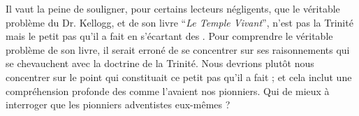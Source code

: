 Il vaut la peine de souligner, pour certains lecteurs négligents, que le véritable problème du Dr. Kellogg, et de son livre “\textit{Le Temple Vivant}”, n'est pas la Trinité mais le petit pas qu'il a fait en s'écartant des . Pour comprendre le véritable problème de son livre, il serait erroné de se concentrer sur ses raisonnements qui se chevauchent avec la doctrine de la Trinité. Nous devrions plutôt nous concentrer sur le point qui constituait ce petit pas qu'il a fait ; et cela inclut une compréhension profonde des  comme l'avaient nos pionniers. Qui de mieux à interroger que les pionniers adventistes eux-mêmes ?
